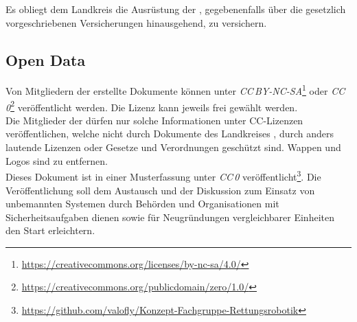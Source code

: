 \noindent Es obliegt dem Landkreis \district{} die Ausrüstung der \callee{}, gegebenenfalls über die gesetzlich vorgeschriebenen Versicherungen hinausgehend, zu versichern.

\subsection{Open Data}

Von Mitgliedern der \callee{} erstellte Dokumente können unter \textit{CC\,BY-NC-SA}\footnote{\url{https://creativecommons.org/licenses/by-nc-sa/4.0/}} oder \textit{CC\,0}\footnote{\url{https://creativecommons.org/publicdomain/zero/1.0/}} veröffentlicht werden. Die Lizenz kann jeweils frei gewählt werden.\\

\noindent Die Mitglieder der \callee{} dürfen nur solche Informationen unter CC-Lizenzen veröffentlichen, welche nicht durch Dokumente des Landkreises \district{}, durch anders lautende Lizenzen oder Gesetze und Verordnungen geschützt sind. Wappen und Logos sind zu entfernen.\\

\noindent Dieses Dokument ist in einer Musterfassung unter \textit{CC\,0} veröffentlicht\footnote{\url{https://github.com/valofly/Konzept-Fachgruppe-Rettungsrobotik}}. Die Veröffentlichung soll dem Austausch und der Diskussion zum Einsatz von unbemannten Systemen durch Behörden und Organisationen mit Sicherheitsaufgaben dienen sowie für Neugründungen vergleichbarer Einheiten den Start erleichtern.
